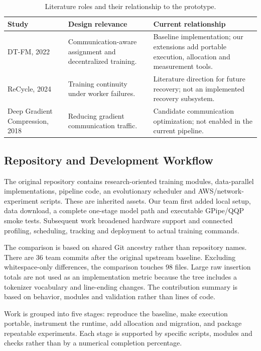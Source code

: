 \begin{table}[H]
\centering\small
\caption{Literature roles and their relationship to the prototype.}
\begin{tabularx}{\textwidth}{P{2.3cm}YY}
\toprule
\textbf{Study} & \textbf{Design relevance} & \textbf{Current relationship}\\
\midrule
DT-FM, 2022 & Communication-aware assignment and decentralized training. & Baseline implementation; our extensions add portable execution, allocation and measurement tools.\\
ReCycle, 2024 & Training continuity under worker failures. & Literature direction for future recovery; not an implemented recovery subsystem.\\
Deep Gradient Compression, 2018 & Reducing gradient communication traffic. & Candidate communication optimization; not enabled in the current pipeline.\\
\bottomrule
\end{tabularx}
\end{table}

\subsection{Repository and Development Workflow}

The original repository contains research-oriented training modules, data-parallel implementations, pipeline code, an evolutionary scheduler and AWS/network-experiment scripts. These are inherited assets. Our team first added local setup, data download, a complete one-stage model path and executable GPipe/QQP smoke tests. Subsequent work broadened hardware support and connected profiling, scheduling, tracking and deployment to actual training commands.

The comparison is based on shared Git ancestry rather than repository names. There are 36 team commits after the original upstream baseline. Excluding whitespace-only differences, the comparison touches 98 files. Large raw insertion totals are not used as an implementation metric because the tree includes a tokenizer vocabulary and line-ending changes. The contribution summary is based on behavior, modules and validation rather than lines of code.

Work is grouped into five stages: reproduce the baseline, make execution portable, instrument the runtime, add allocation and migration, and package repeatable experiments. Each stage is supported by specific scripts, modules and checks rather than by a numerical completion percentage.

